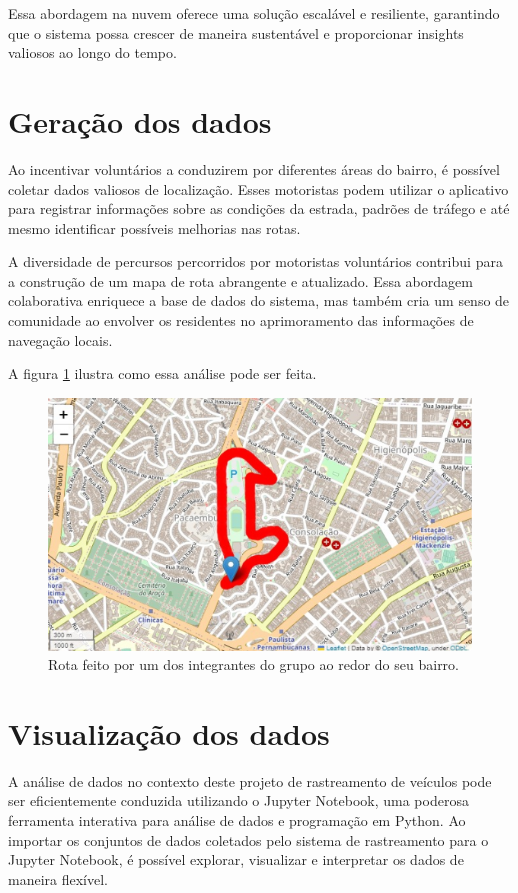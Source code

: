 Essa abordagem na nuvem oferece uma solução escalável e resiliente, garantindo que o sistema possa crescer de maneira sustentável e proporcionar insights valiosos ao longo do tempo.

\section{Geração dos dados}
Ao incentivar voluntários a conduzirem por diferentes áreas do bairro, é possível coletar dados valiosos de localização. Esses motoristas podem utilizar o aplicativo para registrar informações sobre as condições da estrada, padrões de tráfego e até mesmo identificar possíveis melhorias nas rotas. 

A diversidade de percursos percorridos por motoristas voluntários contribui para a construção de um mapa de rota abrangente e atualizado. Essa abordagem colaborativa enriquece a base de dados do sistema, mas também cria um senso de comunidade ao envolver os residentes no aprimoramento das informações de navegação locais. 

A figura \ref{fig:rota} ilustra como essa análise pode ser feita.

\begin{figure}[hp]
    \centering
    
    \includegraphics[scale=0.6]{figures/rota.png}
    
    \caption{Rota feito por um dos integrantes do grupo ao redor do seu bairro.}
    
    \label{fig:rota}
\end{figure}

\section{Visualização dos dados}
A análise de dados no contexto deste projeto de rastreamento de veículos pode ser eficientemente conduzida utilizando o Jupyter Notebook, uma poderosa ferramenta interativa para análise de dados e programação em Python. Ao importar os conjuntos de dados coletados pelo sistema de rastreamento para o Jupyter Notebook, é possível explorar, visualizar e interpretar os dados de maneira flexível. 

